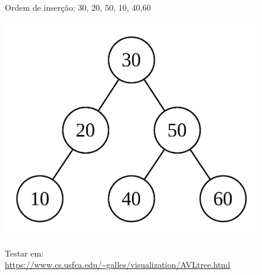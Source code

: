 \documentclass[aspectratio=169]{beamer}
\begin{document}
\begin{frame}
\begin{columns}[T]
\begin{column}{0.5\linewidth}
\begin{figure}[h]
{	~\\
	Ordem de inserção: 30, 20, 50, 10, 40,60}\\
	~\\
	\includegraphics[height=0.30\paperheight]{imagens/avl06.png}\\
	~\\
	\tiny{Testar em: \url{https://www.cs.usfca.edu/~galles/visualization/AVLtree.html}}
\end{figure}
\end{column}
\end{columns}
\end{frame}
\end{document}
